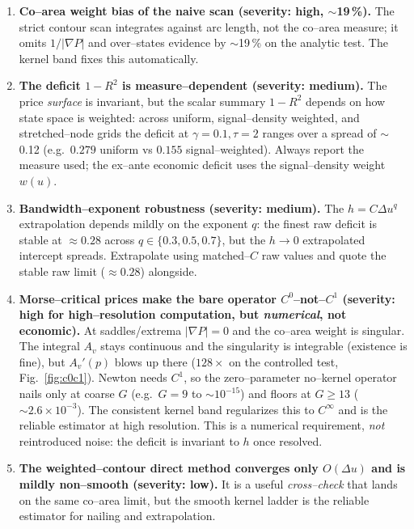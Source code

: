 \documentclass[11pt]{article}
\newcommand{\grad}{\nabla}
\begin{document}
\begin{enumerate}
\item \textbf{Co--area weight bias of the naive scan (severity: high,
  $\sim$19\,\%).} The strict contour scan integrates against arc length, not
  the co--area measure; it omits $1/|\grad P|$ and over--states evidence by
  $\sim$19\,\% on the analytic test. The kernel band fixes this
  automatically.
\item \textbf{The deficit $1-R^2$ is measure--dependent (severity: medium).}
  The price \emph{surface} is invariant, but the scalar summary $1-R^2$
  depends on how state space is weighted: across uniform, signal--density
  weighted, and stretched--node grids the deficit at $\gamma=0.1,\tau=2$
  ranges over a spread of $\sim$0.12 (e.g.\ $0.279$ uniform vs $0.155$
  signal--weighted). Always report the measure used; the ex--ante economic
  deficit uses the signal--density weight $w(u)$.
\item \textbf{Bandwidth--exponent robustness (severity: medium).} The
  $h=C\Delta u^q$ extrapolation depends mildly on the exponent $q$: the
  finest raw deficit is stable at $\approx0.28$ across $q\in\{0.3,0.5,0.7\}$,
  but the $h\to0$ extrapolated intercept spreads. Extrapolate using
  matched--$C$ raw values and quote the stable raw limit ($\approx0.28$)
  alongside.
\item \textbf{Morse--critical prices make the bare operator $C^0$--not--$C^1$
  (severity: high for high--resolution computation, but \emph{numerical}, not
  economic).} At saddles/extrema $|\grad P|=0$ and the co--area weight is
  singular. The integral $A_v$ stays continuous and the singularity is
  integrable (existence is fine), but $A_v'(p)$ blows up there ($128\times$
  on the controlled test, Fig.~\ref{fig:c0c1}). Newton needs $C^1$, so the
  zero--parameter no--kernel operator nails only at coarse $G$ (e.g.\ $G=9$ to
  $\sim10^{-15}$) and floors at $G\ge13$ ($\sim2.6\times10^{-3}$). The
  consistent kernel band regularizes this to $C^\infty$ and is the reliable
  estimator at high resolution. This is a numerical requirement, \emph{not}
  reintroduced noise: the deficit is invariant to $h$ once resolved.
\item \textbf{The weighted--contour direct method converges only
  $O(\Delta u)$ and is mildly non--smooth (severity: low).} It is a useful
  \emph{cross--check} that lands on the same co--area limit, but the smooth
  kernel ladder is the reliable estimator for nailing and extrapolation.
\end{enumerate}
\end{document}
